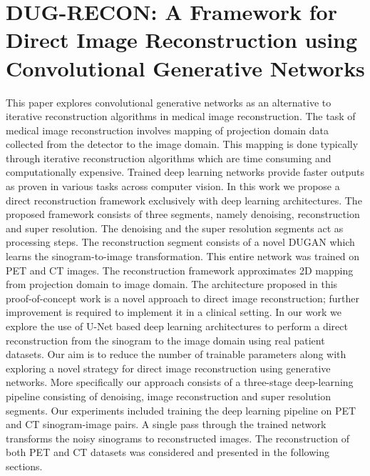 
\chapter{DUG-RECON: A Framework for Direct Image Reconstruction using Convolutional Generative Networks} %

\label{Chapter3} %


This paper explores convolutional generative networks as an alternative to iterative reconstruction algorithms in medical image reconstruction. The task of medical image reconstruction involves mapping of projection domain data collected from the detector to the image domain. This mapping is done typically through iterative reconstruction algorithms which are time consuming and computationally expensive. Trained deep learning networks provide faster outputs as proven in various tasks across computer vision. In this work we propose a direct reconstruction framework exclusively with deep learning architectures. The proposed framework consists of three segments, namely denoising, reconstruction and super resolution. The denoising and the super resolution segments act as processing steps. The reconstruction segment consists of a novel \ac{DUGAN} which learns the sinogram-to-image transformation. This entire network was trained on \ac{PET} and \ac{CT} images. The reconstruction framework approximates \ac{2D} mapping from projection domain to image domain. The architecture proposed in this proof-of-concept work is a novel approach to direct image reconstruction; further improvement is required to implement it in a clinical setting. In our work we explore the use of U-Net  based deep learning architectures \cite{ronneberger2015u} to perform a direct reconstruction from the sinogram to the image domain using real patient datasets. Our aim is to reduce the number of trainable parameters along with exploring a novel strategy for direct image reconstruction using generative networks. More specifically our approach consists of a three-stage deep-learning pipeline consisting of denoising, image reconstruction and super resolution segments. Our experiments included training the deep learning pipeline on \ac{PET} and \ac{CT} sinogram-image pairs. A single pass through the trained network transforms the noisy sinograms to reconstructed images. The reconstruction of both \ac{PET} and \ac{CT} datasets was considered and presented in the following sections.

